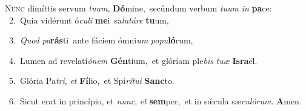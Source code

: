 \lettrine{\initial\textcolor{\initialcolor}{N}}{unc} dimíttis servum \textit{tu}\-\textit{um}, \textbf{Dó}\-mine,~\star secúndum verbum \textit{tu}\-\textit{um} \textit{in} \textbf{pa}\-ce:\\
{\numbfont\textcolor{\numbcolor}{~2.}}~Quia vidérunt ó\-\textit{cu}\-\textit{li} \textbf{me}\-i~\star sa\-\textit{lu}\-\textit{tá}\textit{re} \textbf{tu}\-um,\par
{\numbfont\textcolor{\numbcolor}{~3.}}~\textit{Quod} \textit{pa}\-\textbf{rás}ti~\star ante fáciem ómni\textit{um} \textit{po}\-\textit{pu}\textbf{ló}rum,\par
{\numbfont\textcolor{\numbcolor}{~4.}}~Lumen ad revelati\-\textit{ó}\-\textit{nem} \textbf{Gén}\-tium,~\star et glóriam ple\textit{bis} \textit{tu}\-\textit{æ} \textbf{Is}\-\textbf{ra}ël.\par
{\numbfont\textcolor{\numbcolor}{~5.}}~Glória Pa\-\textit{tri}\-, \textit{et} \textbf{Fí}\-lio,~\star et Spi\-\textit{rí}\-\textit{tu}\textit{i} \textbf{Sanc}\-to.\par
{\numbfont\textcolor{\numbcolor}{~6.}}~Sicut erat in princípio, et \textit{nunc}\-, \textit{et} \textbf{sem}\-per,~\star et in sǽcula sæ\-\textit{cu}\-\textit{ló}\textit{rum}. \textbf{A}\-men.\par
